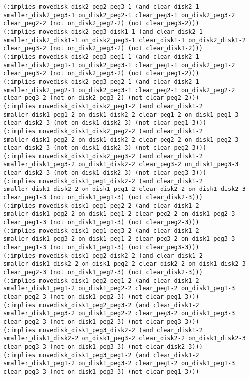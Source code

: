 \documentclass[12pt,letterpaper]{ntdhw}
\begin{document}
\begin{enumerate}
\begin{enumerate}
\begin{lstlisting}[language=pddl, style=pddlstyle,
  basicstyle=\scriptsize]
(:implies movedisk_disk2_peg2_peg3-1 (and clear_disk2-1 smaller_disk2_peg3-1 on_disk2_peg2-1 clear_peg3-1 on_disk2_peg3-2 clear_peg2-2 (not on_disk2_peg2-2) (not clear_peg3-2)))
(:implies movedisk_disk2_peg3_disk1-1 (and clear_disk2-1 smaller_disk2_disk1-1 on_disk2_peg3-1 clear_disk1-1 on_disk2_disk1-2 clear_peg3-2 (not on_disk2_peg3-2) (not clear_disk1-2)))
(:implies movedisk_disk2_peg3_peg1-1 (and clear_disk2-1 smaller_disk2_peg1-1 on_disk2_peg3-1 clear_peg1-1 on_disk2_peg1-2 clear_peg3-2 (not on_disk2_peg3-2) (not clear_peg1-2)))
(:implies movedisk_disk2_peg3_peg2-1 (and clear_disk2-1 smaller_disk2_peg2-1 on_disk2_peg3-1 clear_peg2-1 on_disk2_peg2-2 clear_peg3-2 (not on_disk2_peg3-2) (not clear_peg2-2)))
(:implies movedisk_disk1_disk2_peg1-2 (and clear_disk1-2 smaller_disk1_peg1-2 on_disk1_disk2-2 clear_peg1-2 on_disk1_peg1-3 clear_disk2-3 (not on_disk1_disk2-3) (not clear_peg1-3)))
(:implies movedisk_disk1_disk2_peg2-2 (and clear_disk1-2 smaller_disk1_peg2-2 on_disk1_disk2-2 clear_peg2-2 on_disk1_peg2-3 clear_disk2-3 (not on_disk1_disk2-3) (not clear_peg2-3)))
(:implies movedisk_disk1_disk2_peg3-2 (and clear_disk1-2 smaller_disk1_peg3-2 on_disk1_disk2-2 clear_peg3-2 on_disk1_peg3-3 clear_disk2-3 (not on_disk1_disk2-3) (not clear_peg3-3)))
(:implies movedisk_disk1_peg1_disk2-2 (and clear_disk1-2 smaller_disk1_disk2-2 on_disk1_peg1-2 clear_disk2-2 on_disk1_disk2-3 clear_peg1-3 (not on_disk1_peg1-3) (not clear_disk2-3)))
(:implies movedisk_disk1_peg1_peg2-2 (and clear_disk1-2 smaller_disk1_peg2-2 on_disk1_peg1-2 clear_peg2-2 on_disk1_peg2-3 clear_peg1-3 (not on_disk1_peg1-3) (not clear_peg2-3)))
(:implies movedisk_disk1_peg1_peg3-2 (and clear_disk1-2 smaller_disk1_peg3-2 on_disk1_peg1-2 clear_peg3-2 on_disk1_peg3-3 clear_peg1-3 (not on_disk1_peg1-3) (not clear_peg3-3)))
(:implies movedisk_disk1_peg2_disk2-2 (and clear_disk1-2 smaller_disk1_disk2-2 on_disk1_peg2-2 clear_disk2-2 on_disk1_disk2-3 clear_peg2-3 (not on_disk1_peg2-3) (not clear_disk2-3)))
(:implies movedisk_disk1_peg2_peg1-2 (and clear_disk1-2 smaller_disk1_peg1-2 on_disk1_peg2-2 clear_peg1-2 on_disk1_peg1-3 clear_peg2-3 (not on_disk1_peg2-3) (not clear_peg1-3)))
(:implies movedisk_disk1_peg2_peg3-2 (and clear_disk1-2 smaller_disk1_peg3-2 on_disk1_peg2-2 clear_peg3-2 on_disk1_peg3-3 clear_peg2-3 (not on_disk1_peg2-3) (not clear_peg3-3)))
(:implies movedisk_disk1_peg3_disk2-2 (and clear_disk1-2 smaller_disk1_disk2-2 on_disk1_peg3-2 clear_disk2-2 on_disk1_disk2-3 clear_peg3-3 (not on_disk1_peg3-3) (not clear_disk2-3)))
(:implies movedisk_disk1_peg3_peg1-2 (and clear_disk1-2 smaller_disk1_peg1-2 on_disk1_peg3-2 clear_peg1-2 on_disk1_peg1-3 clear_peg3-3 (not on_disk1_peg3-3) (not clear_peg1-3)))

\end{lstlisting}
\end{enumerate}
\end{enumerate}
\end{document}

